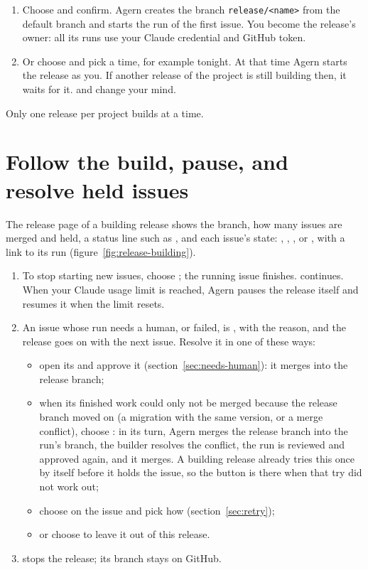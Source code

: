 \begin{enumerate}
  \item Choose  and confirm. Agern creates the branch \texttt{release/<name>} from
    the default branch and starts the run of the first issue. You become the release's owner: all
    its runs use your Claude credential and GitHub token.
  \item Or choose  and pick a time, for example tonight. At that time
    Agern starts the release as you. If another release of the project is still building then, it
    waits for it.  and  change your mind.
\end{enumerate}

Only one release per project builds at a time.

\section{Follow the build, pause, and resolve held issues}\label{sec:release-building}

The release page of a building release shows the branch, how many issues are merged and held, a
status line such as , and each issue's state: ,
, ,  or , with a link to its run
(figure~\ref{fig:release-building}).

\begin{enumerate}
  \item To stop starting new issues, choose ; the running issue finishes. 
    continues. When your Claude usage limit is reached, Agern pauses the release itself and
    resumes it when the limit resets.
  \item An issue whose run needs a human, or failed, is , with the reason, and the release
    goes on with the next issue. Resolve it in one of these ways:
    \begin{itemize}
      \item open its  and approve it (section~\ref{sec:needs-human}): it merges into the
        release branch;
      \item when its finished work could only not be merged because the release branch moved on (a
        migration with the same version, or a merge conflict), choose : in its
        turn, Agern merges the release branch into the run's branch, the builder resolves the
        conflict, the run is reviewed and approved again, and it merges. A building release already
        tries this once by itself before it holds the issue, so the button is there when that try did
        not work out;
      \item choose  on the issue and pick how (section~\ref{sec:retry});
      \item or choose  to leave it out of this release.
    \end{itemize}
  \item {} stops the release; its branch stays on GitHub.
\end{enumerate}

